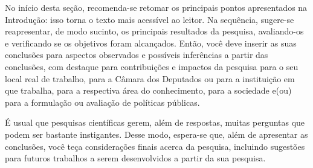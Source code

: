 No início desta seção, recomenda-se retomar os principais pontos apresentados na Introdução: isso torna o texto mais acessível ao leitor. Na sequência, sugere-se reapresentar, de modo sucinto, os principais resultados da pesquisa, avaliando-os e verificando se os objetivos foram alcançados. Então, você deve inserir as suas conclusões para aspectos observados e possíveis inferências a partir das conclusões, com destaque para contribuições e impactos da pesquisa para o seu local real de trabalho, para a Câmara dos Deputados ou para a instituição em que trabalha, para a respectiva área do conhecimento, para a sociedade e(ou) para a formulação ou avaliação de políticas públicas.

É usual que pesquisas científicas gerem, além de respostas, muitas perguntas que podem ser bastante instigantes. Desse modo, espera-se que, além de apresentar as conclusões, você teça considerações finais acerca da pesquisa, incluindo sugestões para futuros trabalhos a serem desenvolvidos a partir da sua pesquisa.



